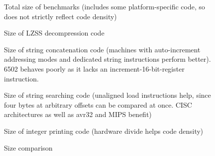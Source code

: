 \documentclass{article}[10pt]
\begin{document}
\begin{figure}[tbp]
  \centering
  \caption{Total size of benchmarks 
           (includes some platform-specific code, so does not
           strictly reflect code density)}
  \label{figure:total}
\end{figure}

\begin{figure}[tbp]
  \centering
  \caption{Size of LZSS decompression code}
  \label{figure:decomp}
\end{figure}

\begin{figure}[tbp]
  \centering
  \caption{Size of string concatenation code (machines with 
           auto-increment addressing modes and dedicated
           string instructions perform better). 6502 behaves poorly as it
           lacks an increment-16-bit-register instruction.}
  \label{figure:strcat}
\end{figure}

\begin{figure}[tbp]
  \centering
  \caption{Size of string searching code (unaligned load
           instructions help, since four bytes at arbitrary offsets 
           can be compared at once.  
           CISC architectures as well as avr32 and MIPS benefit)}
  \label{figure:findstring}
\end{figure}

\begin{figure}[tbp]
  \centering
  \caption{Size of integer printing code (hardware
           divide helps code density)}
  \label{figure:numascii}
\end{figure}

\begin{figure}[tbp]
  \centering
  \caption{Size comparison}
  \label{figure:libc}
\end{figure}

{


}
\end{document}
